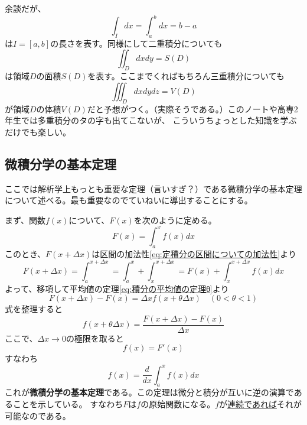 \documentclass[a4j,dvipdfmx]{jsarticle}
\begin{document}
                余談だが、
                \begin{equation*}
                    \int_I dx = \int_{a}^{b}dx = b-a
                \end{equation*}
                は$I=[a,b]$の長さを表す。同様にして二重積分についても
                \begin{equation*}
                    \iint _D dx dy = S(D)
                \end{equation*}
                は領域$D$の面積$S(D)$を表す。ここまでくればもちろん三重積分についても
                \begin{equation*}
                    \iiint _D dx dy dz = V(D)  
                \end{equation*}
                が領域$D$の体積$V(D)$だと予想がつく。（実際そうである。）このノートや高専2年生では多重積分のタの字も出てこないが、
                こういうちょっとした知識を学ぶだけでも楽しい。
            \clearpage
            \subsection{微積分学の基本定理}
                ここでは解析学上もっとも重要な定理（言いすぎ？）である微積分学の基本定理について述べる。最も重要なのでていねいに導出することにする。

                まず、関数$f(x)$について、$F(x)$を次のように定める。
                \begin{equation*}
                    F(x)=\int_a^x f(x)dx
                \end{equation*}
                このとき、$F(x+\Delta x)$は区間の加法性\eqref{eq:定積分の区間についての加法性}より
                \begin{equation*}
                    F(x+\Delta x)=\int_a^{x+\Delta x}=\int_a^x + \int_{x}^{x+\Delta x}=F(x)+\int_x^{x+\Delta x}f(x)dx
                \end{equation*}
                よって、移項して平均値の定理\eqref{eq:積分の平均値の定理θ}より
                \begin{equation*}
                    F(x+\Delta x)-F(x)=\Delta xf(x+\theta\Delta x)\quad (0<\theta<1)
                \end{equation*}
                式を整理すると
                \begin{equation*}
                    f(x+\theta \Delta x) = \frac{F(x+\Delta x)-F(x)}{\Delta x}
                \end{equation*}
                ここで、$\Delta x\to 0$の極限を取ると
                \begin{equation*}
                    f(x)=F'(x)
                \end{equation*}
                すなわち
                \begin{equation}
                    f(x)=\frac{d}{dx}\int_a^x f(x)dx\label{eq:微積分学の基本定理}
                \end{equation}
                これが\textbf{微積分学の基本定理}である。この定理は微分と積分が互いに逆の演算であることを示している。
                すなわち$F$は$f$の原始関数になる。$f$が\underline{連続であれば}それが可能なのである。
\end{document}
